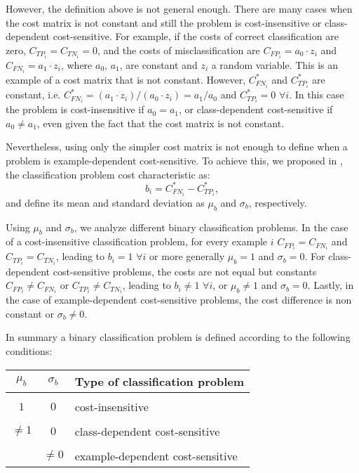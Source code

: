   However, the definition above is not general enough. There are many cases when the cost matrix 
  is not constant and still the problem is cost-insensitive or class-dependent cost-sensitive. 
  For example, if the costs of correct classification are zero, $C_{TP_i}=C_{TN_i}=0$, 
  and the costs of misclassification are $C_{FP_i}=a_0\cdot z_i$ and $C_{FN_i}=a_1\cdot z_i$,
  where $a_0$, $a_1$, are constant and $z_i$ a random variable. This is an example of a cost 
  matrix that is not constant. However, $C^*_{FN_i}$ and $C^*_{TP_i}$ are constant, i.e. 
  $C^*_{FN_i}=(a_1\cdot z_i)/(a_0\cdot z_i)=a_1/a_0$ and $C^*_{TP_i}=0$ $\forall i$. In 
  this case the problem is cost-insensitive if $a_0=a_1$, or class-dependent cost-sensitive if 
  $a_0 \ne a_1$, even given the fact that the cost matrix is not constant.

  Nevertheless, using only the simpler cost matrix is not enough to define when a problem is 
  example-dependent cost-sensitive. To achieve this, we proposed in \citep{CorreaBahnsen2015}, 
  the classification problem cost characteristic as:
  \begin{equation}
    b_i = C^*_{FN_i}-C^*_{TP_i},
  \end{equation}
  and define its mean and standard deviation as $\mu_b$ and $\sigma_b$, respectively.

  Using $\mu_b$ and $\sigma_b$, we analyze different binary classification problems. In the case 
  of a cost-insensitive classification problem, for every example $i$ \mbox{$C_{FP_i}=C_{FN_i}$}
  and $C_{TP_i}=C_{TN_i}$, leading to $b_i=1$ $\forall i$ or more generally $\mu_b=1$ and 
  $\sigma_b=0$. For class-dependent cost-sensitive problems, the costs are not equal but 
  constants \mbox{$C_{FP_i}\ne C_{FN_i}$} or \mbox{$C_{TP_i}\ne C_{TN_i}$}, leading to $b_i \ne 
  1$ $\forall i$, or $\mu_b \ne 1$ and $\sigma_b=0$. Lastly, in the case of example-dependent 
  cost-sensitive problems, the cost difference is non constant or $\sigma_b \ne 0$.

  In summary a binary classification problem is defined according to the following conditions:
  \begin{center}
    \footnotesize
    \begin{tabular}{c | c | l}
      $\mu_b$ & $\sigma_b$ & Type of classification problem \\
      \hline 
      && \\
      $1$ &  $0$ & cost-insensitive \\ &&\\
      $\ne 1$ & $0$ & class-dependent cost-sensitive \\ &&\\
      & $\ne 0$ & example-dependent cost-sensitive \\ 
    \end{tabular}
  \end{center}
  

